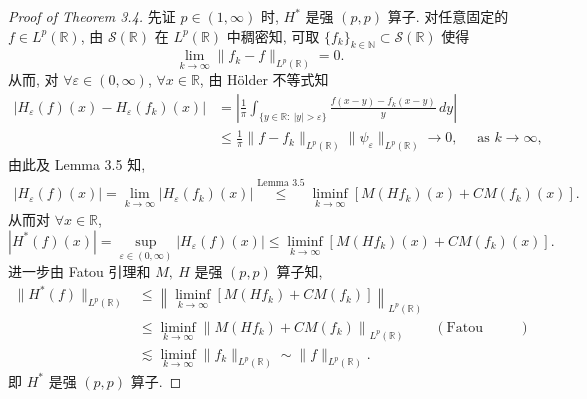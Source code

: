 \documentclass[a4paper,11pt]{article}
\theoremstyle{definition}
\begin{document}
\begin{CJK*}{UTF8}{gbsn}
\begin{proof}[Proof of Theorem 3.4]
    先证 $ p \in (1, \infty) $ 时, $ H^* $ 是强 $ (p, p) $ 算子.
    对任意固定的 $ f \in L^p(\mathbb{R}) $, 
    由 $ \mathcal{S}(\mathbb{R}) $ 在 $ L^p(\mathbb{R}) $ 中稠密知, 
    可取 $ \{f_k\}_{k \in \mathbb{N}} \subset \mathcal{S}(\mathbb{R}) $ 使得
    $$
        \lim_{k \to \infty} \| f_k - f \|_{L^p(\mathbb{R})} = 0.
    $$
    从而, 对 $ \forall \varepsilon \in (0, \infty) $, $ \forall x \in \mathbb{R} $, 由 H\"older 不等式知
    \begin{align*} 
       | H_\varepsilon (f) (x) - H_\varepsilon (f_k) (x) |
          &=\left| \frac{1}{\pi} \int_{\{y \in \mathbb{R}:\ |y|>\varepsilon\}} \frac{f(x-y)-f_k(x-y)}{y} \, dy \right| \\
          &\leq \frac{1}{\pi} \| f - f_k \|_{L^p(\mathbb{R})} \| \psi_\varepsilon \|_{L^p(\mathbb{R})}
          \to 0, \quad \text{ as }  k \to \infty,
    \end{align*}
    由此及 Lemma 3.5 知,
    \begin{align*}
        | H_\varepsilon (f) (x)|
            = \lim_{k \to \infty} | H_\varepsilon (f_k) (x) |
            \overset{\text{Lemma 3.5}}{\leq} \liminf_{k \to \infty} [M(Hf_k)(x)  + C M (f_k) (x)].
    \end{align*}
    从而对 $ \forall x \in \mathbb{R} $,
    $$
        | H^* (f) (x)| = \sup_{\varepsilon \in (0, \infty)} | H_\varepsilon (f) (x)|
            \leq \liminf_{k \to \infty} [M(Hf_k)(x)  + C M (f_k) (x)].
    $$
    进一步由 Fatou 引理和 $ M,\ H $ 是强 $ (p, p) $ 算子知, 
    \begin{align*}
        \| H^* (f)  \|_{L^p(\mathbb{R})}
            &\leq \left\| \liminf_{k \to \infty} [ M(Hf_k) + C M (f_k) ] \right\|_{L^p(\mathbb{R})} \\
            &\leq \liminf_{k \to \infty}  \left\|  M(Hf_k) + C M (f_k) \right\|_{L^p(\mathbb{R})}
                & (\text{Fatou Lemma}) \\
            &\lesssim \liminf_{k \to \infty} \| f_k  \|_{L^p(\mathbb{R})}
            \sim \| f \|_{L^p(\mathbb{R})}.
    \end{align*}
    即 $ H^* $ 是强 $ (p, p) $ 算子.
    

\end{proof}
\end{CJK*}
\end{document}
